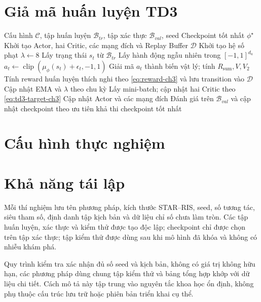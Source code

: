\section{Giả mã huấn luyện TD3}
\begin{algorithm}[H]
\caption{Huấn luyện TD3 với hành động khả thi và ưu tiên QoS}
\label{alg:td3-training}
\begin{algorithmic}[1]
\Require Cấu hình $\mathcal C$, tập huấn luyện $\mathcal B_{tr}$, tập xác thực $\mathcal B_{val}$, seed
\Ensure Checkpoint tốt nhất $\phi^{\star}$
\State Khởi tạo Actor, hai Critic, các mạng đích và Replay Buffer $\mathcal D$
\State Khởi tạo hệ số phạt $\lambda\leftarrow8$
  \State Lấy trạng thái $s_t$ từ $\mathcal B_{tr}$
    \State Lấy hành động ngẫu nhiên trong $[-1,1]^{d_a}$
  \Else
    \State $a_t\leftarrow\operatorname{clip}(\mu_{\phi}(s_t)+\epsilon_t,-1,1)$
  \EndIf
  \State Giải mã $a_t$ thành biến vật lý; tính $R_{\mathrm{sum}},V,V_2$
  \State Tính reward huấn luyện thích nghi theo \eqref{eq:reward-ch3} và lưu transition vào $\mathcal D$
  \State Cập nhật EMA và $\lambda$ theo chu kỳ
    \State Lấy mini-batch; cập nhật hai Critic theo \eqref{eq:td3-target-ch3}
      \State Cập nhật Actor và các mạng đích
    \EndIf
  \EndIf
    \State Đánh giá trên $\mathcal B_{val}$ và cập nhật checkpoint theo ưu tiên khả thi
  \EndIf
\EndFor
\State \Return checkpoint tốt nhất
\end{algorithmic}
\end{algorithm}

\section{Cấu hình thực nghiệm}


\section{Khả năng tái lập}
Mỗi thí nghiệm lưu tên phương pháp, kích thước STAR--RIS, seed, số tương tác, siêu tham số, định danh tập kịch bản và dữ liệu chỉ số chưa làm tròn. Các tập huấn luyện, xác thực và kiểm thử được tạo độc lập; checkpoint chỉ được chọn trên tập xác thực; tập kiểm thử được dùng sau khi mô hình đã khóa và không có nhiễu khám phá.

Quy trình kiểm tra xác nhận đủ số seed và kịch bản, không có giá trị không hữu hạn, các phương pháp dùng chung tập kiểm thử và bảng tổng hợp khớp với dữ liệu chi tiết. Cách mô tả này tập trung vào nguyên tắc khoa học ổn định, không phụ thuộc cấu trúc lưu trữ hoặc phiên bản triển khai cụ thể.

